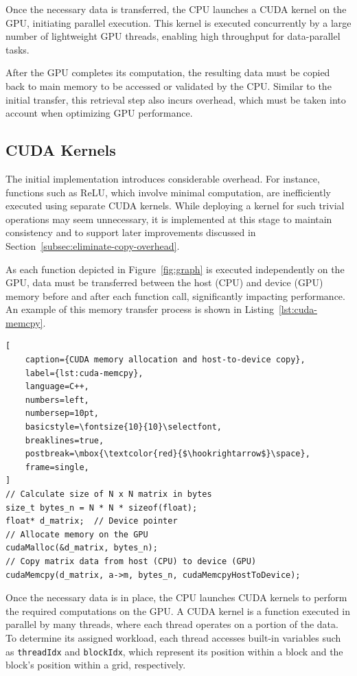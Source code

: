 \documentclass[modern,longauthor]{aastex7}
\begin{document}
Once the necessary data is transferred, the CPU launches a CUDA kernel on the GPU, initiating parallel execution. This kernel is executed concurrently by a large number of lightweight GPU threads, enabling high throughput for data-parallel tasks.

After the GPU completes its computation, the resulting data must be copied back to main memory to be accessed or validated by the CPU. Similar to the initial transfer, this retrieval step also incurs overhead, which must be taken into account when optimizing GPU performance.
\subsection{CUDA Kernels}\label{subsec:cuda-kernels}
The initial implementation introduces considerable overhead. For instance, functions such as ReLU, which involve minimal computation, are inefficiently executed using separate CUDA kernels. While deploying a kernel for such trivial operations may seem unnecessary, it is implemented at this stage to maintain consistency and to support later improvements discussed in Section~\ref{subsec:eliminate-copy-overhead}.

As each function depicted in Figure~\ref{fig:graph} is executed independently on the GPU, data must be transferred between the host (CPU) and device (GPU) memory before and after each function call, significantly impacting performance. An example of this memory transfer process is shown in Listing~\ref{lst:cuda-memcpy}.

\begin{lstlisting}[
    caption={CUDA memory allocation and host-to-device copy},
    label={lst:cuda-memcpy},
    language=C++,
    numbers=left,
    numbersep=10pt,
    basicstyle=\fontsize{10}{10}\selectfont,
    breaklines=true,
    postbreak=\mbox{\textcolor{red}{$\hookrightarrow$}\space},
    frame=single,
]
// Calculate size of N x N matrix in bytes
size_t bytes_n = N * N * sizeof(float);
float* d_matrix;  // Device pointer
// Allocate memory on the GPU
cudaMalloc(&d_matrix, bytes_n);
// Copy matrix data from host (CPU) to device (GPU)
cudaMemcpy(d_matrix, a->m, bytes_n, cudaMemcpyHostToDevice);
\end{lstlisting}

Once the necessary data is in place, the CPU launches CUDA kernels to perform the required computations on the GPU. A CUDA kernel is a function executed in parallel by many threads, where each thread operates on a portion of the data. To determine its assigned workload, each thread accesses built-in variables such as \texttt{threadIdx} and \texttt{blockIdx}, which represent its position within a block and the block's position within a grid, respectively.
\end{document}
